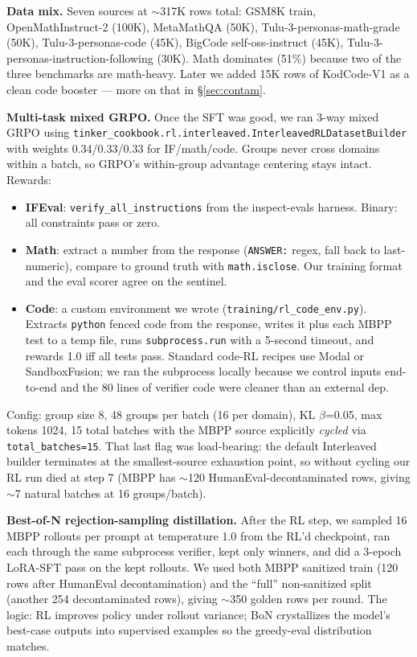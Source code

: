 \documentclass[11pt]{article}
\begin{document}
\textbf{Data mix.} Seven sources at $\sim$317K rows total: GSM8K train, OpenMathInstruct-2 (100K), MetaMathQA (50K), Tulu-3-personas-math-grade (50K), Tulu-3-personas-code (45K), BigCode self-oss-instruct (45K), Tulu-3-personas-instruction-following (30K). Math dominates (51\%) because two of the three benchmarks are math-heavy. Later we added 15K rows of KodCode-V1 as a clean code booster --- more on that in \S\ref{sec:contam}.

\textbf{Multi-task mixed GRPO.} Once the SFT was good, we ran 3-way mixed GRPO using \texttt{tinker\_cookbook.rl.interleaved.InterleavedRLDatasetBuilder} with weights 0.34/0.33/0.33 for IF/math/code. Groups never cross domains within a batch, so GRPO's within-group advantage centering stays intact. Rewards:
\begin{itemize}
  \setlength\itemsep{-0.2em}
  \item \textbf{IFEval}: \texttt{verify\_all\_instructions} from the inspect-evals harness. Binary: all constraints pass or zero.
  \item \textbf{Math}: extract a number from the response (\texttt{ANSWER:} regex, fall back to last-numeric), compare to ground truth with \texttt{math.isclose}. Our training format and the eval scorer agree on the sentinel.
  \item \textbf{Code}: a custom environment we wrote (\texttt{training/rl\_code\_env.py}). Extracts \texttt{python} fenced code from the response, writes it plus each MBPP test to a temp file, runs \texttt{subprocess.run} with a 5-second timeout, and rewards 1.0 iff all tests pass. Standard code-RL recipes use Modal or SandboxFusion; we ran the subprocess locally because we control inputs end-to-end and the 80 lines of verifier code were cleaner than an external dep.
\end{itemize}

Config: group size 8, 48 groups per batch (16 per domain), KL $\beta$=0.05, max tokens 1024, 15 total batches with the MBPP source explicitly \emph{cycled} via \texttt{total\_batches=15}. That last flag was load-bearing: the default Interleaved builder terminates at the smallest-source exhaustion point, so without cycling our RL run died at step 7 (MBPP has $\sim$120 HumanEval-decontaminated rows, giving $\sim$7 natural batches at 16 groups/batch).

\textbf{Best-of-N rejection-sampling distillation.} After the RL step, we sampled 16 MBPP rollouts per prompt at temperature 1.0 from the RL'd checkpoint, ran each through the same subprocess verifier, kept only winners, and did a 3-epoch LoRA-SFT pass on the kept rollouts. We used both MBPP sanitized train (120 rows after HumanEval decontamination) and the ``full'' non-sanitized split (another 254 decontaminated rows), giving $\sim$350 golden rows per round. The logic: RL improves policy under rollout variance; BoN crystallizes the model's best-case outputs into supervised examples so the greedy-eval distribution matches.
\end{document}
